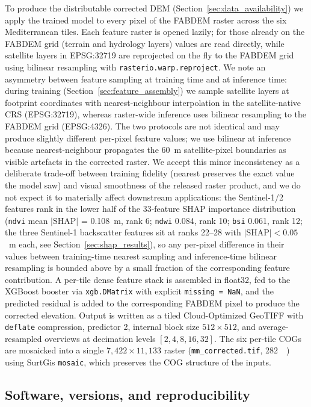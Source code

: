 \documentclass[preprint,authoryear,number]{elsarticle}
\begin{document}
To produce the distributable corrected DEM (Section~\ref{sec:data_availability}) we apply the trained model to every pixel of the FABDEM raster across the six Mediterranean tiles. Each feature raster is opened lazily; for those already on the FABDEM grid (terrain and hydrology layers) values are read directly, while satellite layers in EPSG:32719 are reprojected on the fly to the FABDEM grid using bilinear resampling with \texttt{rasterio.warp.reproject}. We note an asymmetry between feature sampling at training time and at inference time: during training (Section~\ref{sec:feature_assembly}) we sample satellite layers at footprint coordinates with nearest-neighbour interpolation in the satellite-native CRS (EPSG:32719), whereas raster-wide inference uses bilinear resampling to the FABDEM grid (EPSG:4326). The two protocols are not identical and may produce slightly different per-pixel feature values; we use bilinear at inference because nearest-neighbour propagates the 60~m satellite-pixel boundaries as visible artefacts in the corrected raster. We accept this minor inconsistency as a deliberate trade-off between training fidelity (nearest preserves the exact value the model saw) and visual smoothness of the released raster product, and we do not expect it to materially affect downstream applications: the Sentinel-1/2 features rank in the lower half of the 33-feature SHAP importance distribution (\texttt{ndvi} mean $|\mathrm{SHAP}|$ = 0.108~m, rank 6; \texttt{ndwi} 0.084, rank 10; \texttt{bsi} 0.061, rank 12; the three Sentinel-1 backscatter features sit at ranks 22--28 with $|\mathrm{SHAP}| < 0.05$~m each, see Section~\ref{sec:shap_results}), so any per-pixel difference in their values between training-time nearest sampling and inference-time bilinear resampling is bounded above by a small fraction of the corresponding feature contribution. A per-tile dense feature stack is assembled in float32, fed to the XGBoost booster via \texttt{xgb.DMatrix} with explicit \texttt{missing = NaN}, and the predicted residual is added to the corresponding FABDEM pixel to produce the corrected elevation. Output is written as a tiled Cloud-Optimized GeoTIFF with \texttt{deflate} compression, predictor 2, internal block size $512 \times 512$, and average-resampled overviews at decimation levels $[2, 4, 8, 16, 32]$. The six per-tile COGs are mosaicked into a single $7{,}422 \times 11{,}133$ raster (\texttt{mm\_corrected.tif}, \SI{282}{\mega\byte}) using SurtGis \texttt{mosaic}, which preserves the COG structure of the inputs.

\subsection{Software, versions, and reproducibility}
\label{sec:software}
\end{document}
